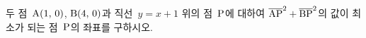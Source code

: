 두 점~$\mathrm{A}(1,\,0)$, $\mathrm{B}(4,\,0)$과 직선~$y=x+1$ 위의 점~$\mathrm{P}$에 대하여 $\overline{\mathrm{AP}}^2+\overline{\mathrm{BP}}^2$의 값이 최소가 되는 점~$\mathrm{P}$의 좌표를 구하시오.
